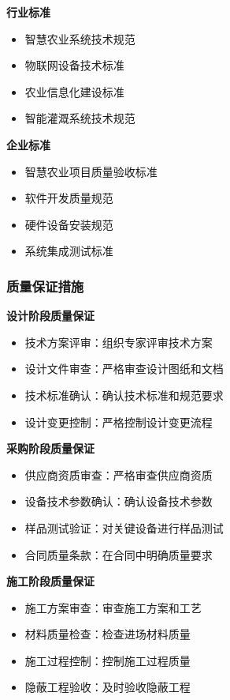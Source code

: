 \documentclass[UTF8,a4paper,12pt]{article}
\begin{document}
\textbf{行业标准}
\begin{itemize}
    \item 智慧农业系统技术规范
    \item 物联网设备技术标准
    \item 农业信息化建设标准
    \item 智能灌溉系统技术规范
\end{itemize}

\textbf{企业标准}
\begin{itemize}
    \item 智慧农业项目质量验收标准
    \item 软件开发质量规范
    \item 硬件设备安装规范
    \item 系统集成测试标准
\end{itemize}

\subsubsection{质量保证措施}
\textbf{设计阶段质量保证}
\begin{itemize}
    \item 技术方案评审：组织专家评审技术方案
    \item 设计文件审查：严格审查设计图纸和文档
    \item 技术标准确认：确认技术标准和规范要求
    \item 设计变更控制：严格控制设计变更流程
\end{itemize}

\textbf{采购阶段质量保证}
\begin{itemize}
    \item 供应商资质审查：严格审查供应商资质
    \item 设备技术参数确认：确认设备技术参数
    \item 样品测试验证：对关键设备进行样品测试
    \item 合同质量条款：在合同中明确质量要求
\end{itemize}

\textbf{施工阶段质量保证}
\begin{itemize}
    \item 施工方案审查：审查施工方案和工艺
    \item 材料质量检查：检查进场材料质量
    \item 施工过程控制：控制施工过程质量
    \item 隐蔽工程验收：及时验收隐蔽工程
\end{itemize}
\end{document}
